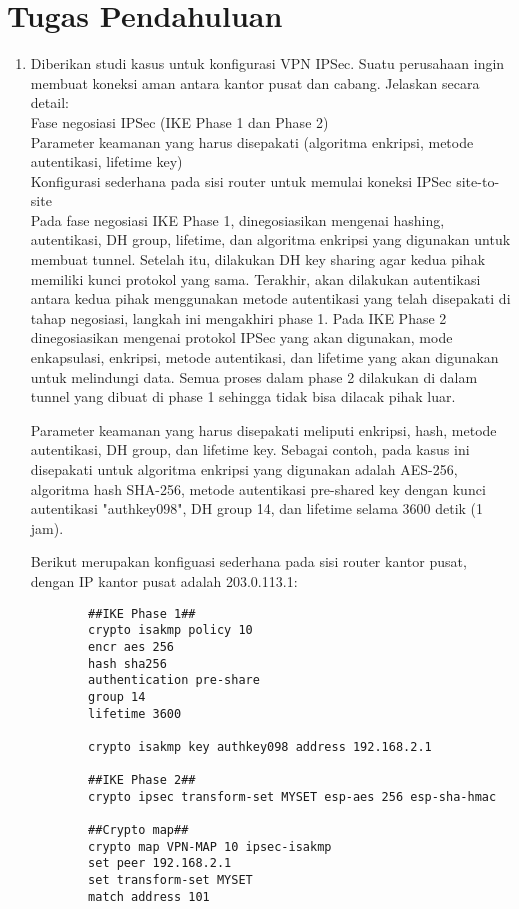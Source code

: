 \section{Tugas Pendahuluan}
\begin{enumerate}
	\item Diberikan studi kasus untuk konfigurasi VPN IPSec. Suatu perusahaan ingin membuat koneksi aman antara kantor pusat dan cabang. Jelaskan secara detail:\\
	Fase negosiasi IPSec (IKE Phase 1 dan Phase 2)\\
	Parameter keamanan yang harus disepakati (algoritma enkripsi, metode autentikasi, lifetime key)\\
	Konfigurasi sederhana pada sisi router untuk memulai koneksi IPSec site-to-site\\
	
	Pada fase negosiasi IKE Phase 1, dinegosiasikan mengenai hashing, autentikasi, DH group, lifetime, dan algoritma enkripsi yang digunakan untuk membuat tunnel. Setelah itu, dilakukan DH key sharing agar kedua pihak memiliki kunci protokol yang sama. Terakhir, akan dilakukan autentikasi antara kedua pihak menggunakan metode autentikasi yang telah disepakati di tahap negosiasi, langkah ini mengakhiri phase 1. Pada IKE Phase 2 dinegosiasikan mengenai protokol IPSec yang akan digunakan, mode enkapsulasi, enkripsi, metode autentikasi, dan lifetime yang akan digunakan untuk melindungi data. Semua proses dalam phase 2 dilakukan di dalam tunnel yang dibuat di phase 1 sehingga tidak bisa dilacak pihak luar.
	
	Parameter keamanan yang harus disepakati meliputi enkripsi, hash, metode autentikasi, DH group, dan lifetime key. Sebagai contoh, pada kasus ini disepakati untuk algoritma enkripsi yang digunakan adalah AES-256, algoritma hash SHA-256, metode autentikasi pre-shared key dengan kunci autentikasi "authkey098", DH group 14, dan lifetime selama 3600 detik (1 jam).
	
	Berikut merupakan konfiguasi sederhana pada sisi router kantor pusat, dengan IP kantor pusat adalah 203.0.113.1:
	\begin{lstlisting}
		##IKE Phase 1##
		crypto isakmp policy 10
		encr aes 256
		hash sha256
		authentication pre-share
		group 14
		lifetime 3600
		
		crypto isakmp key authkey098 address 192.168.2.1
		
		##IKE Phase 2##
		crypto ipsec transform-set MYSET esp-aes 256 esp-sha-hmac
		
		##Crypto map##
		crypto map VPN-MAP 10 ipsec-isakmp
		set peer 192.168.2.1
		set transform-set MYSET
		match address 101
		

\end{lstlisting}
\end{enumerate}
